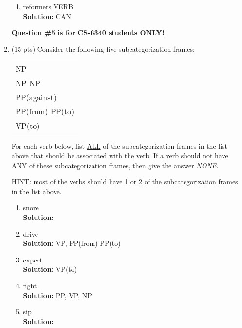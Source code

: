 \documentclass[11pt]{article}
\begin{document}
\begin{enumerate}
\begin{enumerate}
\item reformers VERB \\
\textbf{Solution:} CAN\\
 
\end{enumerate}


\underline{\textbf{Question \#5 is for CS-6340 students ONLY!}}  \\

\item (15 pts) Consider the following five subcategorization frames:

\begin{center}
\begin{tabular}{|l|} \hline
NP  \\
NP NP \\
PP(against) \\
PP(from) PP(to) \\
VP(to) \\ \hline
\end{tabular}
\end{center}

For each verb below, list \underline{ALL} of the subcategorization
frames in the list above that should be associated with the verb. 
If a verb should not have ANY of these
subcategorization frames, then give the answer {\it NONE}.

\noindent
HINT: most of the verbs should have 1 or 2 of the subcategorization
frames in the list above.  \\

\begin{enumerate}

\item snore \\
\textbf{Solution:} \\

\item drive  \\
\textbf{Solution:} VP, PP(from) PP(to)\\

\item expect \\
\textbf{Solution:} VP(to)\\

\item fight \\
\textbf{Solution:} PP, VP, NP\\

\item sip \\
\textbf{Solution:} \\


\end{enumerate}
\end{enumerate}
\end{document}
